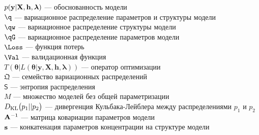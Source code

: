 $p(\mathbf{y}|\mathbf{X}, \mathbf{h},\boldsymbol{\lambda})$ --- обоснованность модели\\
$\q$ --- вариационное распределение параметров и структуры модели\\
$\qw$ --- вариационное распределение структуры модели\\
$\qG$ --- вариационное распределение параметров модели\\
$\Loss$ --- функция потерь\\
$\Val$ --- валидационная функция\\
$T(\boldsymbol{\theta} |L(\boldsymbol{\theta} |\mathbf{y},\mathbf{X},\mathbf{h},\boldsymbol{\lambda}))$ --- оператор оптимизации\\
$\mathfrak{Q}$ --- семейство вариационных распределений\\
$\mathsf{S}$ --- энтропия распределения\\
$M$ --- множество моделей без общей параметризации\\
$D_\text{KL}\bigl(p_1 || p_2\bigr)$ --- дивергенция Кульбака-Лейблера  между распределениями $p_1$ и $p_2$
$\mathbf{A}^{-1}$ --- матрица ковариации параметров модели\\
$\mathbf{s}$ --- конкатенация параметров концентрации на структуре модели
